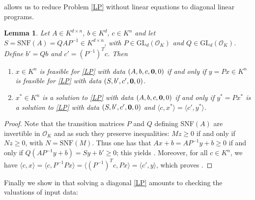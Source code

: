\documentclass[a4paper,oneside,11pt]{article}
\newtheorem{lemma}[theorem]{Lemma}
\newcommand{\allmat}{\mathbb{M}} %
\newcommand{\OK}{\mathcal{O}_K}
\newcommand{\GL}{\mathrm{GL}}
\begin{document}

 allows us to reduce Problem \eqref{LP} without linear equations
to diagonal linear programs.

\begin{lemma} \label{solsLP}
  Let $A \in K^{d\times n}$, $b \in K^d$, $c\in K^n$ and let
  $S = \mathrm{SNF}(A) = QAP^{-1} \in K^{d\times n}$, with
  $P \in \GL_d(\OK)$ and $Q\in \GL_d(\OK)$.
  Define $b' = Qb$ and $c' = (P^{-1})^Tc$.
  Then
   \begin{enumerate}
   \item \label{solsLP_item1}
     $x \in K^n$ is feasible for \eqref{LP} with data $(A,b,c,{\bf 0},0)$ if and only if $y = P x \in K^n$ is
     feasible for \eqref{LP} with data $(S,b',c',{\bf 0},0)$.
   \item \label{solsLP_item2}
     $x^* \in K^n$ is a solution to \eqref{LP} with data $(A,b,c,{\bf 0},0)$ if and only if $y^* = P x^*$ is
     a solution to \eqref{LP} with data $(S,b',c',{\bf 0},0)$ and $\langle c,x^* \rangle = \langle c',y^* \rangle$.
   \end{enumerate}
\end{lemma}
\begin{proof}
  Note that the transition matrices $P$ and $Q$ defining SNF$(A)$ are invertible in $\OK$
  and as such they preserve inequalities: $Mz \geq 0$ if and only if $Nz \geq 0$, with
  $N = \mathrm{SNF}(M)$. Thus one has that $Ax+b = AP^{-1}y +b \geq 0$ if and only if
  $Q(AP^{-1}y + b) = Sy + b' \geq 0$; this yields .
  Moreover, for all $c \in K^n$, we have $\langle c, x\rangle = \langle c, P^{-1}Px \rangle =
  \langle (P^{-1})^T c, Px \rangle = \langle c',y\rangle$, which proves
  .
\end{proof}

Finally we show in  that solving a diagonal \eqref{LP} amounts
to checking the valuations of input data:
\end{document}
